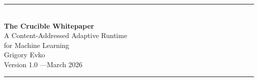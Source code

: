 \documentclass[11pt, a4paper]{article}
\begin{document}
\begin{center}
  \vspace*{0.8em}
  {\color{rulegray}\rule{\textwidth}{1.2pt}}\\[1.5em]
  {\fontsize{24}{28}\selectfont\sffamily\bfseries The Crucible Whitepaper}\\[0.5em]
  {\large\sffamily A Content-Addressed Adaptive Runtime\\[0.15em]for Machine Learning}\\[1.8em]
  {\normalsize Grigory Evko}\\[0.3em]
  {\small\textcolor{black!45}{Version 1.0 \quad---\quad March 2026}}\\[1.5em]
  {\color{rulegray}\rule{\textwidth}{1.2pt}}
\end{center}
\thispagestyle{empty}
\vspace{1.2em}














\end{document}
